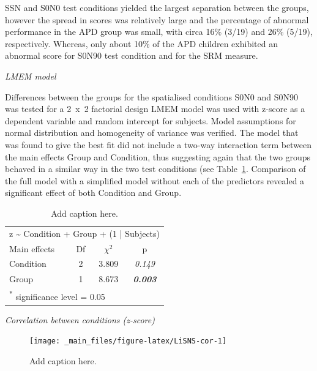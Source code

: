 \documentclass[a4paper, twoside]{templates/ociamthesis}
\begin{document}
SSN and S0N0 test conditions yielded the largest separation between the groups, however the spread in scores was relatively large and the percentage of abnormal performance in the APD group was small, with circa 16\% (3/19) and 26\% (5/19), respectively. Whereas, only about 10\% of the APD children exhibited an abnormal score for S0N90 test condition and for the SRM measure.

\colorbox[HTML]{CCCCFF}{\emph{LMEM model}}

Differences between the groups for the spatialised conditions S0N0 and S0N90 was tested for a 2~x~2 factorial design LMEM model was used with z-score as a dependent variable and random intercept for subjects. Model assumptions for normal distribution and homogeneity of variance was verified. The model that was found to give the best fit did not include a two-way interaction term between the main effects Group and Condition, thus suggesting again that the two groups behaved in a similar way in the two test conditions (see Table~\ref{tab:LiSNS-zLMEM}. Comparison of the full model with a simplified model without each of the predictors revealed a significant effect of both Condition and Group.

\begin{table}

\caption{\label{tab:LiSNS-zLMEM}Add caption here.}
\centering
\begin{tabular}[t]{lcc>{}c}
\toprule
\multicolumn{4}{c}{z \textasciitilde{} Condition + Group + (1 | Subjects)} \\
\cmidrule(l{3pt}r{3pt}){1-4}
Main effects & Df & $\chi^{2}$ & p\\
\midrule
Condition & 2 & 3.809 & \em{0.149}\\
Group & 1 & 8.673 & \em{\textbf{0.003}}\\
\bottomrule
\multicolumn{4}{l}{\textsuperscript{*} significance level = 0.05}\\
\end{tabular}
\end{table}

\colorbox[HTML]{CCCCFF}{\emph{Correlation between conditions (z-score)}}

\begin{figure}

{\centering \texttt{[image: \_main\_files/figure-latex/LiSNS-cor-1]} 

}

\caption{Add caption here.}\label{fig:LiSNS-cor}
\end{figure}
\end{document}
